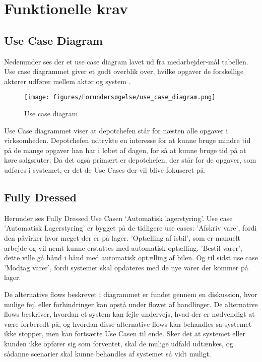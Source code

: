 \section{Funktionelle krav}\label{sec:funktionelle-krav}

\subsection{Use Case Diagram}
Nedenunder ses der et use case diagram lavet ud fra medarbejder-mål tabellen. Use case diagrammet giver et godt overblik over, hvilke opgaver de forskellige aktører udfører mellem aktør og system \cite{visual-paradigm.com}. 

\begin{figure}[H]
    \centering
    \texttt{[image: figures/Forundersøgelse/use\_case\_diagram.png]}
    \caption{Use case diagram}
    \label{fig:use_case_diagram}
\end{figure}

Use Case diagrammet viser at depotchefen står for næsten alle opgaver i virksomheden. Depotchefen udtrykte en interesse for at kunne bruge mindre tid på de mange opgaver han har i løbet af dagen, for så at kunne bruge tid på at køre salgsruter. Da det også primært er depotchefen, der står for de opgaver, som udføres i systemet, er det de Use Cases der vil blive fokuseret på.

\subsection{Fully Dressed} \label{fullydressed}

Herunder ses Fully Dressed Use Casen ‘Automatisk lagerstyring’. Use case 'Automatisk Lagerstyring' er bygget på de tidligere use cases: 'Afskriv vare', fordi den påvirker hvor meget der er på lager. 'Optælling af isbil', som er manuelt arbejde og vil nemt kunne erstattes med automatisk optælling. 'Bestil varer', dette ville gå hånd i hånd med automatisk optælling af bilen. Og til sidst use case 'Modtag varer', fordi systemet skal opdateres med de nye varer der kommer på lager. 

De alternative flows beskrevet i diagrammet er fundet gennem en diskussion, hvor mulige fejl eller forhindringer kan opstå under flowet af handlinger. De alternative flows beskriver, hvordan et system kan fejle undervejs, hvad der er nødvendigt at være forberedt på, og hvordan disse alternative flows kan behandles så systemet ikke stopper, men kan fortsætte Use Casen til ende. Sker det at systemet eller kunden ikke opfører sig som forventet, skal de mulige udfald udtænkes, og sådanne scenarier skal kunne behandles af systemet så vidt muligt.



